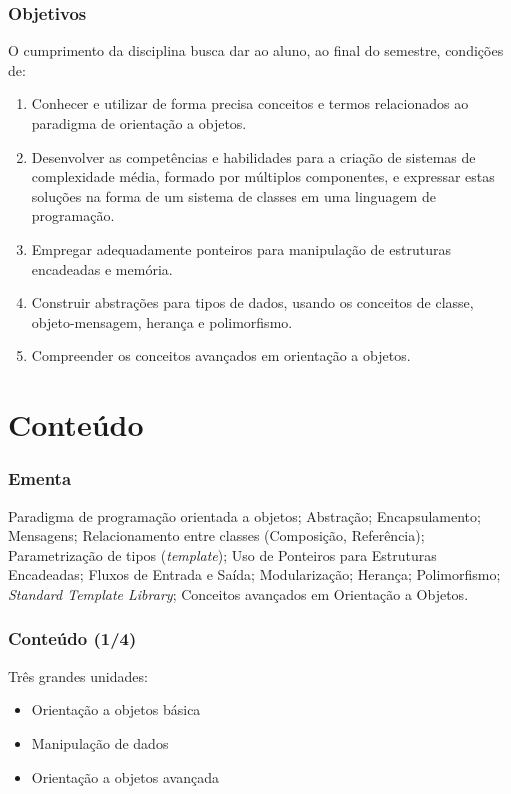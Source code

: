 \documentclass[aspectratio=169]{beamer}
\begin{document}
\begin{frame}\frametitle{Objetivos}
O cumprimento da disciplina busca dar ao aluno, ao final do semestre, condições de:
\begin{enumerate}
	\item Conhecer e utilizar de forma precisa conceitos e termos relacionados ao paradigma de orientação a objetos.
	\item Desenvolver as competências e habilidades para a criação de sistemas de complexidade média, formado por múltiplos componentes, e expressar estas soluções na forma de um sistema de classes em uma linguagem de programação.
	\item Empregar adequadamente ponteiros para manipulação de estruturas encadeadas e memória.
	\item Construir abstrações para tipos de dados, usando os conceitos de classe, objeto-mensagem, herança e polimorfismo.
	\item Compreender os conceitos avançados em orientação a objetos.
\end{enumerate}
\end{frame}




\section{Conte\'udo}


\begin{frame}\frametitle{Ementa}
Paradigma de programação orientada a objetos; Abstração; Encapsulamento; Mensagens; Relacionamento entre classes (Composição, Referência); Parametrização de tipos (\emph{template}); Uso de Ponteiros para Estruturas Encadeadas; Fluxos de Entrada e Saída; Modularização; Herança; Polimorfismo; \emph{Standard Template Library}; Conceitos avançados em Orientação a Objetos.
\end{frame}


\begin{frame}\frametitle{Conte\'udo (1/4)}
Três grandes unidades:
\begin{itemize}
	\item Orientação a objetos básica
	\item Manipulação de dados
	\item Orientação a objetos avançada
\end{itemize}
\end{frame}
\end{document}
